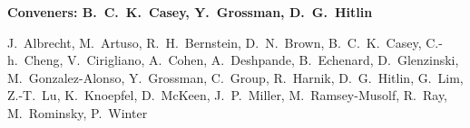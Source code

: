 

\begin{center}

\begin{large} {\bf Conveners: B.~C.~K.~Casey, Y.~Grossman, D.~G.~Hitlin} \end{large}

J.~Albrecht,
M.~Artuso,
R.~H.~Bernstein,
D.~N.~Brown,
B.~C.~K.~Casey,
C.-h.~Cheng,
V.~Cirigliano,
A.~Cohen,
A.~Deshpande,
B.~Echenard,
D.~Glenzinski,
M.~Gonzalez-Alonso,
Y.~Grossman,
C.~Group,
R.~Harnik,
D.~G.~Hitlin, 
G.~Lim,
Z.-T.~Lu,
K.~Knoepfel,
D.~McKeen,
J.~P.~Miller,
M.~Ramsey-Musolf,
R.~Ray,
M.~Rominsky,
P.~Winter 


\end{center}

